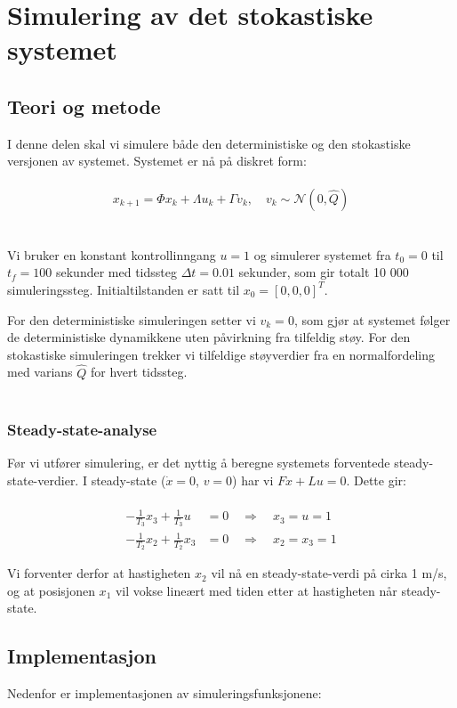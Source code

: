 \documentclass[a4paper,12pt]{article}
\theoremstyle{plain}
\begin{document}
\clearpage
\section{Simulering av det stokastiske systemet}
\subsection{Teori og metode}
I denne delen skal vi simulere både den deterministiske og den stokastiske versjonen av systemet. Systemet er nå på diskret form:
\\\\
\begin{equation}
x_{k+1} = \Phi x_k + \Lambda u_k + \Gamma v_k, \quad v_k \sim \mathcal{N}(0, \hat{Q})
\end{equation}
\\\\
Vi bruker en konstant kontrollinngang $u = 1$ og simulerer systemet fra $t_0 = 0$ til $t_f = 100$ sekunder med tidssteg $\Delta t = 0.01$ sekunder, som gir totalt 10 000 simuleringssteg. Initialtilstanden er satt til $x_0 = [0, 0, 0]^T$.

For den deterministiske simuleringen setter vi $v_k = 0$, som gjør at systemet følger de deterministiske dynamikkene uten påvirkning fra tilfeldig støy. For den stokastiske simuleringen trekker vi tilfeldige støyverdier fra en normalfordeling med varians $\hat{Q}$ for hvert tidssteg.
\\\\
\subsubsection{Steady-state-analyse}
Før vi utfører simulering, er det nyttig å beregne systemets forventede steady-state-verdier. I steady-state ($\dot{x} = 0$, $v = 0$) har vi $Fx + Lu = 0$. Dette gir:
\\\\
\begin{align}
-\frac{1}{T_3}x_3 + \frac{1}{T_3}u &= 0 \quad \Rightarrow \quad x_3 = u = 1 \\
-\frac{1}{T_2}x_2 + \frac{1}{T_2}x_3 &= 0 \quad \Rightarrow \quad x_2 = x_3 = 1
\end{align}

Vi forventer derfor at hastigheten $x_2$ vil nå en steady-state-verdi på cirka 1 m/s, og at posisjonen $x_1$ vil vokse lineært med tiden etter at hastigheten når steady-state.
\clearpage
\subsection{Implementasjon}
Nedenfor er implementasjonen av simuleringsfunksjonene:
\end{document}
